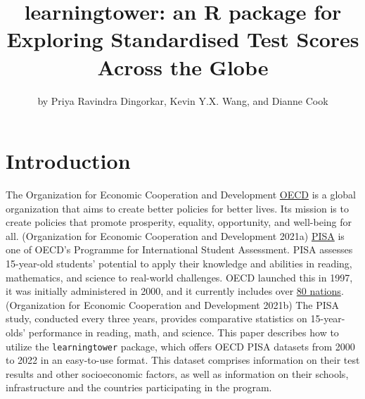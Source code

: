 \title{learningtower: an R package for Exploring Standardised Test Scores Across the Globe}


\author{by Priya Ravindra Dingorkar, Kevin Y.X. Wang, and Dianne Cook}

\maketitle


\hypertarget{introduction}{%
\section{Introduction}\label{introduction}}

The Organization for Economic Cooperation and Development \href{https://www.oecd.org/about/}{OECD} is a global organization that aims to create better policies for better lives. Its mission is to create policies that promote prosperity, equality, opportunity, and well-being for all. (Organization for Economic Cooperation and Development 2021a) \href{https://www.oecd.org/pisa/}{PISA} is one of OECD's Programme for International Student Assessment. PISA assesses 15-year-old students' potential to apply their knowledge and abilities in reading, mathematics, and science to real-world challenges. OECD launched this in 1997, it was initially administered in 2000, and it currently includes over \href{https://www.oecd.org/pisa/aboutpisa/pisa-participants.htm}{80 nations}. (Organization for Economic Cooperation and Development 2021b) The PISA study, conducted every three years, provides comparative statistics on 15-year-olds' performance in reading, math, and science. This paper describes how to utilize the \texttt{learningtower} package, which offers OECD PISA datasets from 2000 to 2022 in an easy-to-use format. This dataset comprises information on their test results and other socioeconomic factors, as well as information on their schools, infrastructure and the countries participating in the program.

